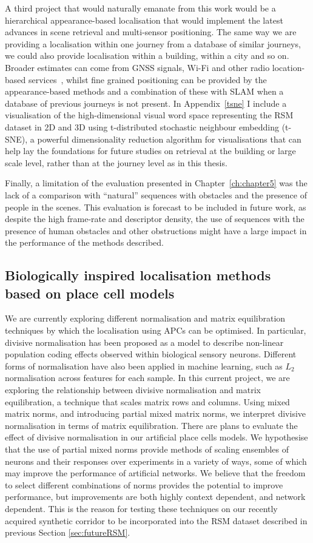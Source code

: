 A third project that would naturally emanate from this work would be a hierarchical appearance-based localisation that would implement the latest advances in scene retrieval and multi-sensor positioning. The same way we are providing a localisation within one journey from a database of similar journeys, we could also provide localisation within a building, within a city and so on. Broader estimates can come from GNSS signals, Wi-Fi and other radio location-based services~\cite{wang2012no}, whilst fine grained positioning can be provided by the appearance-based methods and a combination of these with SLAM when a database of previous journeys is not present. In Appendix~\ref{tsne} I include a visualisation of the high-dimensional visual word space representing the RSM dataset in 2D and 3D using t-distributed stochastic neighbour embedding (t-SNE), a powerful dimensionality reduction algorithm for visualisations that can help lay the foundations for future studies on retrieval at the building or large scale level, rather than at the journey level as in this thesis.

Finally, a limitation of the evaluation presented in Chapter~\ref{ch:chapter5} was the lack of a comparison with ``natural'' sequences with obstacles and the presence of people in the scenes. This evaluation is forecast to be included in future work, as despite the high frame-rate and descriptor density, the use of sequences with the presence of human obstacles and other obstructions might have a large impact in the performance of the methods described.

\subsection{Biologically inspired localisation methods based on place cell models}

We are currently exploring different normalisation and matrix equilibration techniques by which the localisation using APCs can be optimised. In particular, divisive normalisation has been proposed as a model to describe non-linear population coding effects observed within biological sensory neurons. Different forms of normalisation have also been applied in machine learning, such as $L_2$ normalisation across features for each sample. In this current project, we are exploring the relationship between divisive normalisation and matrix equilibration, a technique that scales matrix rows and columns. Using mixed matrix norms, and introducing partial mixed matrix norms, we interpret divisive normalisation in terms of matrix equilibration. There are plans to evaluate the effect of divisive normalisation in our artificial place cells models. We hypothesise that the use of partial mixed norms provide methods of scaling ensembles of neurons and their responses over experiments in a variety of ways, some of which may improve the performance of artificial networks. We believe that the freedom to select different combinations of norms provides the potential to improve performance, but improvements are both highly context dependent, and network dependent. This is the reason for testing these techniques on our recently acquired synthetic corridor to be incorporated into the RSM dataset described in previous Section \ref{sec:futureRSM}.


